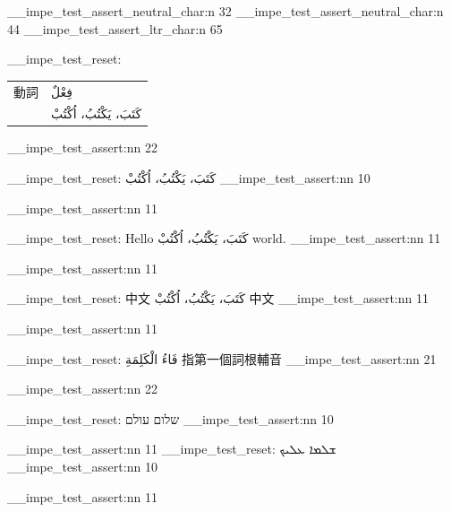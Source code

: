 \documentclass[lang=zh]{impebook}
\begin{document}
\ExplSyntaxOn
\__impe_test_assert_neutral_char:n { 32 }
\__impe_test_assert_neutral_char:n { 44 }
\__impe_test_assert_ltr_char:n { 65 }
\ExplSyntaxOff

\ExplSyntaxOn
\__impe_test_reset:
\ExplSyntaxOff
\begin{tabular}{p{.18\linewidth}p{.68\linewidth}}
  動詞 & فِعْلٌ \\
  & كَتَبَ، يَكْتُبُ، اُكْتُبْ \\
\end{tabular}
\ExplSyntaxOn
\__impe_test_assert:nn {2}{2}
\ExplSyntaxOff

\ExplSyntaxOn
\__impe_test_reset:
\ExplSyntaxOff
\noindent كَتَبَ، يَكْتُبُ، اُكْتُبْ
\ExplSyntaxOn
\__impe_test_assert:nn {1}{0}
\ExplSyntaxOff
\par
\ExplSyntaxOn
\__impe_test_assert:nn {1}{1}
\ExplSyntaxOff

\ExplSyntaxOn
\__impe_test_reset:
\ExplSyntaxOff
\noindent Hello كَتَبَ، يَكْتُبُ، اُكْتُبْ world.
\ExplSyntaxOn
\__impe_test_assert:nn {1}{1}
\ExplSyntaxOff
\par
\ExplSyntaxOn
\__impe_test_assert:nn {1}{1}
\ExplSyntaxOff

\ExplSyntaxOn
\__impe_test_reset:
\ExplSyntaxOff
\noindent 中文 كَتَبَ، يَكْتُبُ، اُكْتُبْ 中文
\ExplSyntaxOn
\__impe_test_assert:nn {1}{1}
\ExplSyntaxOff
\par
\ExplSyntaxOn
\__impe_test_assert:nn {1}{1}
\ExplSyntaxOff

\ExplSyntaxOn
\__impe_test_reset:
\ExplSyntaxOff
\noindent فَاءُ الْكَلِمَةِ 指第一個詞根輔音
\ExplSyntaxOn
\__impe_test_assert:nn {2}{1}
\ExplSyntaxOff
\par
\ExplSyntaxOn
\__impe_test_assert:nn {2}{2}
\ExplSyntaxOff

\ExplSyntaxOn
\__impe_test_reset:
\ExplSyntaxOff
\noindent שלום עולם
\ExplSyntaxOn
\__impe_test_assert:nn {1}{0}
\ExplSyntaxOff
\par
\ExplSyntaxOn
\__impe_test_assert:nn {1}{1}
\__impe_test_reset:
\ExplSyntaxOff
\noindent ܫܠܡܐ ܥܠܝܟ
\ExplSyntaxOn
\__impe_test_assert:nn {1}{0}
\ExplSyntaxOff
\par
\ExplSyntaxOn
\__impe_test_assert:nn {1}{1}
\ExplSyntaxOff
\end{document}
